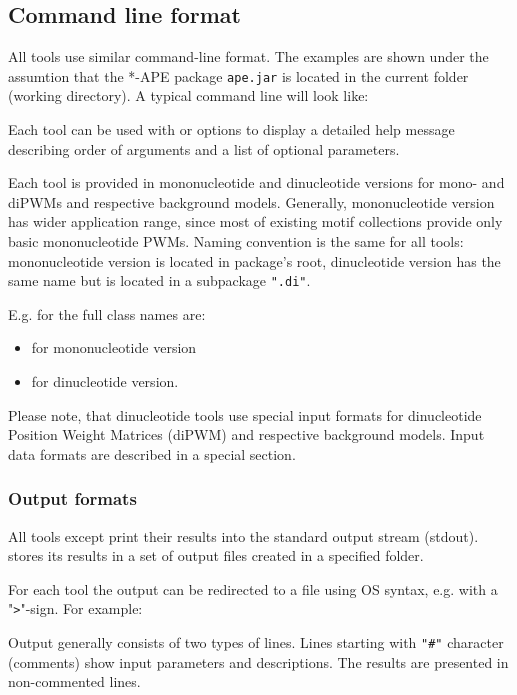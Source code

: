 \subsection{Command line format}
All tools use similar command-line format. The examples are shown under the assumtion that the *-APE package \texttt{ape.jar} is located in the current folder (working directory). A typical command line will look like:\par
\texttt{}

Each tool can be used with  or  options to display a detailed help message describing order of arguments and a list of optional parameters.

Each tool is provided in mononucleotide and dinucleotide versions for mono- and diPWMs and respective background models.
Generally, mononucleotide version has wider application range, since most of existing motif collections provide only basic mononucleotide PWMs.
Naming convention is the same for all tools: mononucleotide version is located in package's root, dinucleotide version has the same name but is located in a subpackage \texttt{".di"}.

E.g. for  the full class names are:
\begin{itemize}
\item{} for mononucleotide version
\item{} for dinucleotide version.
\end{itemize}

Please note, that dinucleotide tools use special input formats for dinucleotide Position Weight Matrices (diPWM) and respective background models. Input data formats are described in a special section.


\subsubsection{Output formats}

All tools except  print their results into the standard output stream (stdout).
 stores its results in a set of output files created in a specified folder.

For each tool the output can be redirected to a file using OS syntax, e.g. with a "\texttt{\textgreater}"-sign. For example:
\texttt{}

Output generally consists of two types of lines. Lines starting with \texttt{"\#"} character (comments) show
input parameters and descriptions. The results are presented in non-commented lines.
